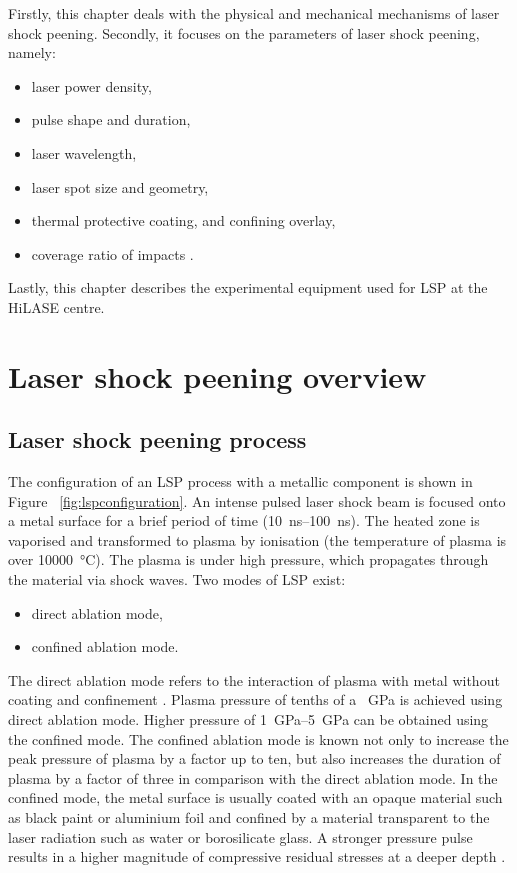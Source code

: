 Firstly, this chapter deals with the physical and mechanical mechanisms of laser shock peening. Secondly, it focuses on the parameters of laser shock peening, namely:

\begin{itemize}
    
    \item laser power density,
    \item pulse shape and duration,
    \item laser wavelength,
    \item laser spot size and geometry,
    \item thermal protective coating, and confining overlay,
    \item coverage ratio of impacts \cite{dane_2000}.

\end{itemize}
Lastly, this chapter describes the experimental equipment used for LSP at the HiLASE centre. 


\section{Laser shock peening overview}

\subsection{Laser shock peening process}
The configuration of an LSP process with a metallic component is shown in Figure~ \ref{fig:lspconfiguration}. An intense pulsed laser shock beam is focused onto a metal surface for a brief period of time (\SIrange{10}{100}{\ns}). The heated zone is vaporised and transformed to plasma by ionisation (the temperature of plasma is over \SI{10000}{\degreeCelsius}). The plasma is under high pressure, which propagates through the material via shock waves. Two modes of LSP exist: 

\begin{itemize}

    \item direct ablation mode,
    \item confined ablation mode.

\end{itemize}

The direct ablation mode refers to the interaction of plasma with metal without coating and confinement \cite{sano}. Plasma pressure of tenths of a \SI{}{\GPa} is achieved using direct ablation mode. Higher pressure of \SIrange{1}{5}{\GPa} can be obtained using the confined mode. The confined ablation mode is known not only to increase the peak pressure of plasma by a factor up to ten, but also increases the duration of plasma by a factor of three in comparison with the direct ablation mode. In the confined mode, the metal surface is usually coated with an opaque material such as black paint or aluminium foil and confined by a material transparent to the laser radiation such as water or borosilicate glass. A stronger pressure pulse results in a higher magnitude of compressive residual stresses at a deeper depth \cite{fairland}. 

